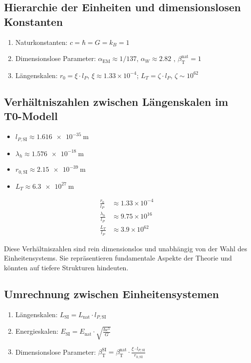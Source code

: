 \documentclass[12pt,a4paper]{article}
\newcommand{\alphaEM}{\alpha_{\text{EM}}}
\newcommand{\betaT}{\beta_{\text{T}}}
\begin{document}
	\subsection{Hierarchie der Einheiten und dimensionslosen Konstanten}
	
	\begin{enumerate}
		\item Naturkonstanten: \(c = \hbar = G = k_B = 1\)
		\item Dimensionslose Parameter: \(\alphaEM \approx 1/137\), \(\alpha_W \approx 2.82\) \cite{pascher_temp_2025}, \(\betaT^{\text{nat}} = 1\)
		\item Längenskalen: \(r_0 = \xi \cdot l_P\), \(\xi \approx 1.33 \times 10^{-4}\); \(L_T = \zeta \cdot l_P\), \(\zeta \sim 10^{62}\)
	\end{enumerate}
	
	\subsection{Verhältniszahlen zwischen Längenskalen im T0-Modell}
	
	\begin{itemize}
		\item \(l_{P,\text{SI}} \approx \SI{1.616e-35}{\meter}\)
		\item \(\lambda_h \approx \SI{1.576e-18}{\meter}\)
		\item \(r_{0,\text{SI}} \approx \SI{2.15e-39}{\meter}\)
		\item \(L_T \approx \SI{6.3e27}{\meter}\)
	\end{itemize}
	\begin{align}
		\frac{r_0}{l_P} &\approx 1.33 \times 10^{-4} \\
		\frac{\lambda_h}{l_P} &\approx 9.75 \times 10^{16} \\
		\frac{L_T}{l_P} &\approx 3.9 \times 10^{62}
	\end{align}
	
	Diese Verhältniszahlen sind rein dimensionslos und unabhängig von der Wahl des Einheitensystems. Sie repräsentieren fundamentale Aspekte der Theorie und könnten auf tiefere Strukturen hindeuten.
	
	\subsection{Umrechnung zwischen Einheitensystemen}
	
	\begin{tcolorbox}[colback=blue!5!white, colframe=blue!75!black, title=Umrechnungsschema]
		\begin{enumerate}
			\item Längenskalen: \(L_{\text{SI}} = L_{\text{nat}} \cdot l_{P,\text{SI}}\)
			\item Energieskalen: \(E_{\text{SI}} = E_{\text{nat}} \cdot \sqrt{\frac{\hbar c^5}{G}}\)
			\item Dimensionslose Parameter: \(\betaT^{\text{SI}} = \betaT^{\text{nat}} \cdot \frac{\xi \cdot l_{P,\text{SI}}}{r_{0,\text{SI}}}\)
		\end{enumerate}
	\end{tcolorbox}
	
\end{document}
